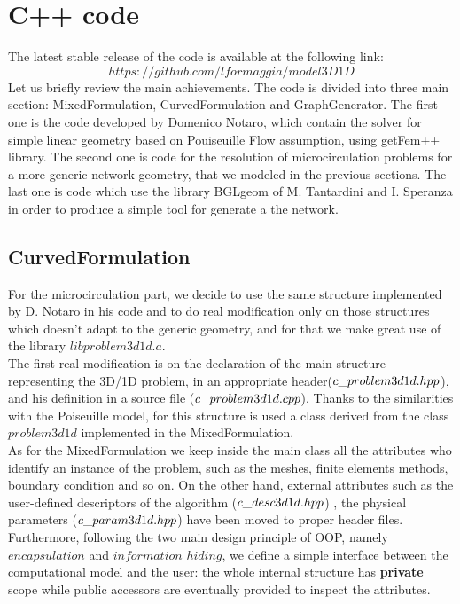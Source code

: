 \documentclass[a4paper]{report}
\begin{document}
\chapter{C++ code}
The latest stable release of the code is available at the following link:
\begin{equation*}
https://github.com/lformaggia/model3D1D
\end{equation*}
Let us briefly review the main achievements. The code is divided into three main section: MixedFormulation, CurvedFormulation and GraphGenerator. The first one is the code developed by Domenico Notaro, which contain the solver for simple linear geometry based on Pouiseuille Flow assumption, using getFem++ library. The second one is code for the resolution of microcirculation problems for a more generic network geometry, that we modeled in the previous sections. The last one is code which use the library BGLgeom of M. Tantardini and I. Speranza in order to produce a simple tool for generate a the network.


\section{CurvedFormulation}
For the microcirculation part, we decide to use the same structure implemented by D. Notaro in his code and to do real modification only on those structures which doesn't adapt to the generic geometry, and for that we make great use of the library $libproblem3d1d.a$.\\
The first real modification is on the declaration of the main structure representing the 3D/1D problem, in an appropriate header($c\_\-problem3d1d.hpp$), and his definition in a source file ($c\_\-problem3d1d.cpp$). Thanks to the similarities with the Poiseuille model, for this structure is used a class derived from the class $problem3d1d$ implemented in the MixedFormulation. \\
As for the MixedFormulation we keep inside the main class all the attributes who identify an instance of the problem, such as the meshes, finite elements methods, boundary condition and so on. On the other hand, external attributes such as the user-defined descriptors of the algorithm ($c\_\-desc3d1d.hpp$) , the physical parameters ($c\_\- param3d1d.hpp$) have been moved to proper header files.
Furthermore, following the two main design principle of OOP, namely $encapsulation$ and $information$ $hiding$, we define a simple interface between the computational model and the user: the whole internal structure has \textbf{ private} scope while public accessors are eventually provided to inspect the attributes.\\
\end{document}
